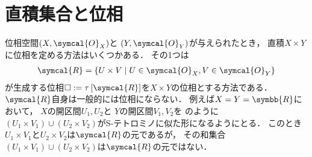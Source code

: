 \documentclass[../main.tex]{subfiles}
\begin{document}
\section{直積集合と位相}
位相空間\((X, \symcal{O}_X)\)と \((Y, \symcal{O}_Y)\)が与えられたとき，
直積\(X \times Y\)に位相を定める方法はいくつかある．
その1つは
\begin{align*}
    \symcal{R} = \{ U \times V \mid U \in \symcal{O}_X, V \in \symcal{O}_Y\}
\end{align*}
が生成する位相\(\Box := \Generatedtopology{\symcal{R}}\)を\(X \times Y\)の位相とする方法である．
\(\symcal{R}\)自身は一般的には位相にならない．
例えば\(X = Y = \symbb{R}\)において，
\(X\)の開区間\(U_1, U_2\)と
\(Y\)の開区間\(V_1, V_2\)を
のように
\((U_1 \times V_1) \cup (U_2 \times V_2)\)がS-テトロミノに似た形になるようにとる．
このとき\(U_1 \times V_1\)と\(U_2 \times V_2\)は\(\symcal{R}\)の元であるが，
その和集合\((U_1 \times V_1) \cup (U_2 \times V_2)\)は\(\symcal{R}\)の元ではない．
\end{document}
